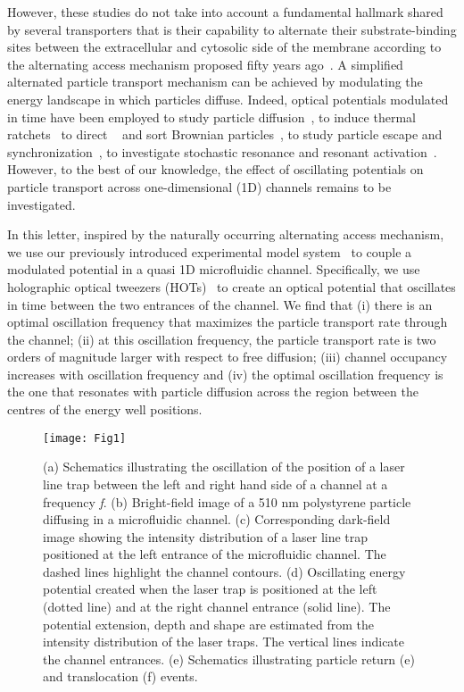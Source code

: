 \documentclass[
 reprint,
 aps, showkeys, showpacs
]{revtex4-1}
\begin{document}
However, these studies do not take into account a fundamental hallmark shared by several transporters that is their capability to alternate their substrate-binding sites between the extracellular and cytosolic side of the membrane according to the alternating access mechanism proposed fifty years ago~\cite{Jardetzky1966}.  A simplified alternated particle transport mechanism can be achieved by modulating the energy landscape in which particles diffuse. Indeed, optical potentials modulated in time have been employed to study particle diffusion~\cite{Lee2006,Juniper2016}, to induce thermal ratchets~\cite{Faucheux1995,Leea} to direct ~\cite{Bleil2007} and sort Brownian particles~\cite{Gorre-Talini1997,MacDonald2003,Jonas2008,Xiao,Ladavac}, to study particle escape and synchronization~\cite{Simon1992}, to investigate stochastic resonance and resonant activation~\cite{Babic2004a,Schmitt2006}. However, to the best of our knowledge, the effect of oscillating potentials on particle transport across one-dimensional (1D) channels remains to be investigated.

In this letter, inspired by the naturally occurring alternating access mechanism, we use our previously introduced experimental model system~\cite{Pagliara2013,Pagliara2014e,Misiunas2015} to couple a modulated potential in a quasi 1D microfluidic channel. Specifically, we use holographic optical tweezers (HOTs)~\cite{Padgett2011b,Bowman2014} to create an optical potential that oscillates in time between the two entrances of the channel. We find that (i) there is an optimal oscillation frequency that maximizes the particle transport rate through the channel; (ii) at this oscillation frequency, the particle transport rate is two orders of magnitude larger with respect to free diffusion; (iii) channel occupancy increases with oscillation frequency and (iv) the optimal oscillation frequency is the one that resonates with particle diffusion across the region between the centres of the energy well positions. 

\begin{figure}
	\texttt{[image: Fig1]}
	\caption{\label{Fig1} (a) Schematics illustrating the oscillation of the position of a laser line trap between the left and right hand side of a channel at a frequency \textit{f}. (b) Bright-field image of a 510 nm polystyrene particle diffusing in a microfluidic channel. (c) Corresponding dark-field image showing the intensity distribution of a laser line trap positioned at the left entrance of the microfluidic channel. The dashed lines highlight the channel contours. (d) Oscillating energy potential created when the laser trap is positioned at the left (dotted line) and at the right channel entrance (solid line). The potential extension, depth and shape are estimated from the intensity distribution of the laser traps. The vertical lines indicate the channel entrances. (e) Schematics illustrating particle return (e) and translocation (f) events.}
\end{figure}
\end{document}
